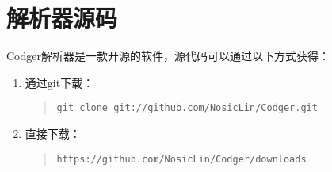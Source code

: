 \section{解析器源码}
Codger解析器是一款开源的软件，源代码可以通过以下方式获得：
\begin{enumerate}
\item 通过git下载：
\begin{quote}
\begin{verbatim}
git clone git://github.com/NosicLin/Codger.git
\end{verbatim}
\end{quote}
\item 直接下载：
\begin{quote}
\begin{verbatim}
https://github.com/NosicLin/Codger/downloads
\end{verbatim}
\end{quote}
\end{enumerate}